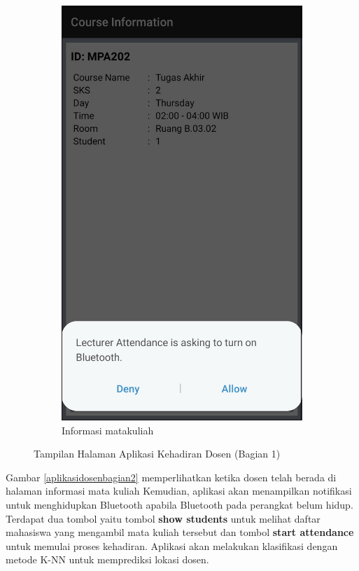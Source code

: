 \begin{enumerate}[a.]
\begin{figure} [H]
	\begin{subfigure}{.5\textwidth}
  		\centering
  		\includegraphics[width=.5\linewidth]{gambar/android/dosen-4}  
  		\caption{Informasi matakuliah}
	\end{subfigure}
		\vspace{0.5cm}
		\caption{Tampilan Halaman Aplikasi Kehadiran Dosen (Bagian 1)}
	\label{aplikasidosenbagian1}
	\end{figure}
	
\vspace{0.5cm}
	\par Gambar \ref{aplikasidosenbagian2} memperlihatkan ketika dosen telah berada di halaman informasi mata kuliah Kemudian, aplikasi akan menampilkan notifikasi untuk menghidupkan Bluetooth apabila Bluetooth pada perangkat belum hidup. Terdapat dua tombol yaitu tombol \textbf{show students} untuk melihat daftar mahasiswa yang mengambil mata kuliah tersebut dan tombol \textbf{start attendance} untuk memulai proses kehadiran. Aplikasi akan melakukan klasifikasi dengan metode K-NN untuk memprediksi lokasi dosen.
	

\end{enumerate}
